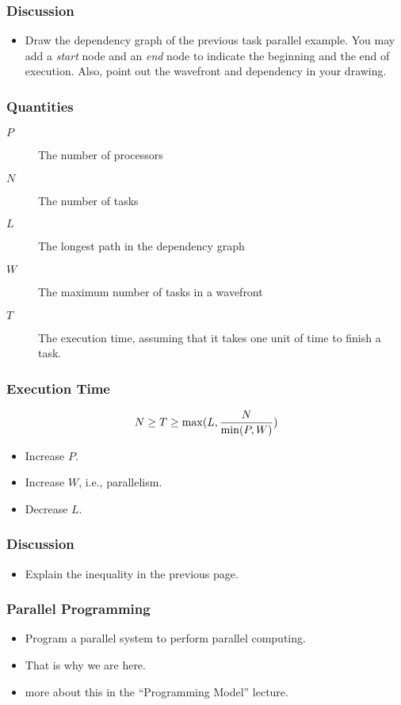 \documentclass{beamer}
\begin{document}
\begin{CJK}{UTF8}{bsmi}
\begin{frame}
\frametitle{Discussion} 
\begin{itemize}
\item Draw the dependency graph of the previous task parallel example. You may add a {\em start} node and an {\em end} node to indicate the beginning and the end of execution. 
Also, point out the wavefront and dependency in your drawing.
\end{itemize}
\end{frame}


\begin{frame}
\frametitle{Quantities} 
\begin{description}
\item [$P$] The number of processors
\item [$N$] The number of tasks 
\item [$L$] The longest path in the dependency graph
\item [$W$] The maximum number of tasks in a wavefront
\item [$T$] The execution time, assuming that it takes one unit of
  time to finish a task.
\end{description}
\end{frame}

\begin{frame}
\frametitle{Execution Time} 
\begin{equation}
N \geq T \ge \max(L, {N \over {\min(P, W)}})
\end{equation}
\begin{itemize}
\item Increase $P$.
\item Increase $W$, i.e., parallelism.
\item Decrease $L$.
\end{itemize}
\end{frame}

\begin{frame}
\frametitle{Discussion} 
\begin{itemize}
\item Explain the inequality in the previous page.
\end{itemize}
\end{frame}

\begin{frame}
\frametitle{Parallel Programming} 
\begin{itemize}
\item Program a parallel system to perform parallel computing.
\item That is why we are here.
\item more about this in the ``Programming Model'' lecture.
\end{itemize}
\end{frame}


\end{CJK}
\end{document}

